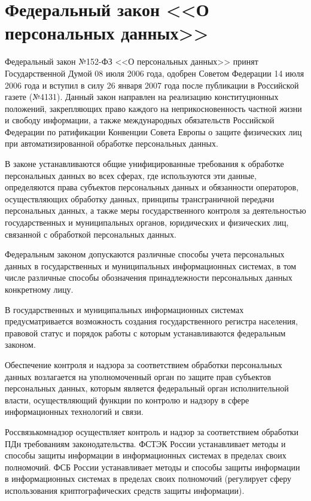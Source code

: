 \section{Федеральный закон <<О персональных данных>>} \label{rights_152}

Федеральный закон №152-ФЗ <<О персональных данных>> принят Государственной Думой 08 июля 2006 года, одобрен Советом Федерации 14 июля 2006 года и вступил в силу 26 января 2007 года после публикации в Российской газете (№4131). Данный закон направлен на реализацию конституционных положений, закрепляющих право каждого на неприкосновенность частной жизни и свободу информации, а также международных обязательств Российской Федерации по ратификации Конвенции Совета Европы о защите физических лиц при автоматизированной обработке персональных данных.

\vspace{\baselineskip}
В законе устанавливаются общие унифицированные требования к обработке персональных данных во всех сферах, где используются эти данные, определяются права субъектов персональных данных и обязанности операторов, осуществляющих обработку данных, принципы трансграничной передачи персональных данных, а также меры государственного контроля за деятельностью государственных и муниципальных органов, юридических и физических лиц, связанной с обработкой персональных данных.

\vspace{\baselineskip}
Федеральным законом допускаются различные способы учета персональных данных в государственных и муниципальных информационных системах, в том числе различные способы обозначения принадлежности персональных данных конкретному лицу.

В государственных и муниципальных информационных системах предусматривается возможность создания государственного регистра населения, правовой статус и порядок работы с которым устанавливаются федеральным законом.

Обеспечение контроля и надзора за соответствием обработки персональных данных возлагается на уполномоченный орган по защите прав субъектов персональных данных, которым является федеральный орган исполнительной власти, осуществляющий функции по контролю и надзору в сфере информационных технологий и связи.

\vspace{\baselineskip}
Россвязькомнадзор осуществляет контроль и надзор за соответствием обработки ПДн требованиям законодательства.
ФСТЭК России устанавливает методы и способы защиты информации в информационных системах в пределах своих полномочий.
ФСБ России устанавливает методы и способы защиты информации в информационных системах в пределах своих полномочий (регулирует сферу использования криптографических средств защиты информации).